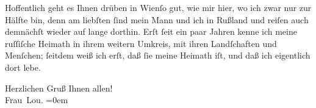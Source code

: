 \pstart
           Hoffentlich geht es Ihnen drüben in Wienſo gut, wie mir hier, wo ich zwar nur zur Hälfte
               bin, denn {\pb}am liebſten ſind mein Mann und ich in Rußland und reiſen auch demnächſt wieder auf
               lange dorthin. Erſt ſeit ein paar Jahren kenne ich meine ruſſiſche Heimath in ihrem weitern Umkreis, mit ihren
               Landſchaften und Menſchen; ſeitdem weiß ich erſt, daß ſie meine Heimath iſt, und daß
               ich eigentlich dort lebe.\pend
           
\pstart
           Herzlichen Gruß Ihnen allen!{\\[\baselineskip]}\spacefill\mbox{Frau Lou.}\pend
           \leftskip=0em{}\endnumbering{}  
      